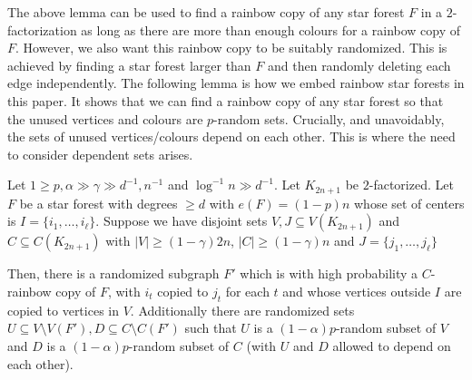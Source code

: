 The above lemma can be used to find a rainbow copy of any star forest $F$ in a $2$-factorization as long as there are more than enough colours for a rainbow copy of $F$. However, we  also want this rainbow copy to be suitably randomized. This is achieved by finding a star forest larger than $F$ and then randomly deleting each edge independently.
The following lemma is how we embed rainbow star forests in this paper. It shows that we can find a rainbow copy of any star forest so that the unused vertices and colours are $p$-random sets. Crucially, and unavoidably, the sets of unused vertices/colours depend on each other. This is where the need to consider dependent sets arises.
\begin{lemma}\label{Lemma_randomized_star_forest}
Let $1\geq p, \alpha\gg \gamma\gg d^{-1}, n^{-1}$ and $\log^{-1} n\gg d^{-1}$. Let  $K_{2n+1}$ be $2$-factorized.
Let $F$ be a star forest with degrees $\geq d$   with $e(F)= (1-p)n$ whose set of centers is $I=\{i_1, \dots, i_{\ell}\}$. Suppose we have disjoint sets $V,J\subseteq V(K_{2n+1})$ and $C\subseteq C(K_{2n+1})$ with $|V|\geq (1-\gamma)2n$, $|C|\geq (1-\gamma)n$ and  $J=\{j_1, \dots, j_{\ell}\}$

Then, there is a randomized subgraph $F'$  which is with high probability a $C$-rainbow copy of $F$,  with $i_t$ copied to $j_t$ for each $t$ and whose  vertices outside $I$ are copied to vertices in $V$. Additionally there are randomized sets $U\subseteq V\setminus V(F'), D\subseteq C\setminus C(F')$ such that $U$ is a $(1-\alpha)p$-random subset of $V$ and $D$ is a $(1-\alpha)p$-random subset of $C$ (with $U$ and $D$ allowed to depend on each other).
\end{lemma}


